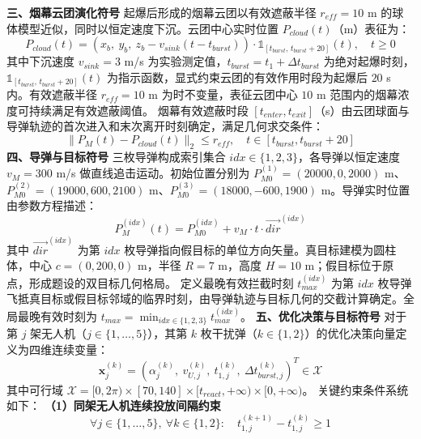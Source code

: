 \documentclass{JXUSTmodeling}
\begin{document}
\textbf{三、烟幕云团演化符号}
起爆后形成的烟幕云团以有效遮蔽半径 $r_{eff}=10$ m 的球体模型近似，同时以恒定速度下沉。云团中心实时位置 $P_{cloud}(t)$（m）表征为：
\begin{equation}
P_{cloud}(t) = \left(x_b,\ y_b,\ z_b - v_{sink}(t-t_{burst})\right) \cdot \mathbb{1}_{[t_{burst},\, t_{burst}+20]}(t),\quad t \geq 0 \tag{4}
\end{equation}
其中下沉速度 $v_{sink}=3$ m/s 为实验测定值，$t_{burst}=t_1+\Delta t_{burst}$ 为绝对起爆时刻，$\mathbb{1}_{[t_{burst},\, t_{burst}+20]}(t)$ 为指示函数，显式约束云团的有效作用时段为起爆后 $20$ s 内。有效遮蔽半径 $r_{eff}=10$ m 为时不变量，表征云团中心 $10$ m 范围内的烟幕浓度可持续满足有效遮蔽阈值。
烟幕有效遮蔽时段 $[t_{enter}, t_{exit}]$（s）由云团球面与导弹轨迹的首次进入和末次离开时刻确定，满足几何求交条件：
\begin{equation}
\|P_M(t)-P_{cloud}(t)\|_2 \leq r_{eff},\quad t \in [t_{burst}, t_{burst}+20] \tag{5}
\end{equation}
\textbf{四、导弹与目标符号}
三枚导弹构成索引集合 $idx\in\{1,2,3\}$，各导弹以恒定速度 $v_M=300$ m/s 做直线追击运动。初始位置分别为 $P_{M0}^{(1)}=(20000,0,2000)$ m、$P_{M0}^{(2)}=(19000,600,2100)$ m、$P_{M0}^{(3)}=(18000,-600,1900)$ m。导弹实时位置由参数方程描述：
\begin{equation}
P_M^{(idx)}(t) = P_{M0}^{(idx)} + v_M \cdot t \cdot \vec{dir}^{(idx)} \tag{6}
\end{equation}
其中 $\vec{dir}^{(idx)}$ 为第 $idx$ 枚导弹指向假目标的单位方向矢量。真目标建模为圆柱体，中心 $c=(0,200,0)$ m，半径 $R=7$ m，高度 $H=10$ m；假目标位于原点，形成题设的双目标几何格局。
定义最晚有效拦截时刻 $t_{max}^{(idx)}$ 为第 $idx$ 枚导弹飞抵真目标或假目标邻域的临界时刻，由导弹轨迹与目标几何的交截计算确定。全局最晚有效时刻为 $t_{max} = \min_{idx\in\{1,2,3\}} t_{max}^{(idx)}$。
\textbf{五、优化决策与目标符号}
对于第 $j$ 架无人机（$j\in\{1,\ldots,5\}$），其第 $k$ 枚干扰弹（$k\in\{1,2\}$）的优化决策向量定义为四维连续变量：
\begin{equation}
\mathbf{x}_j^{(k)} = \left(\alpha_j^{(k)},\ v_{U,j}^{(k)},\ t_{1,j}^{(k)},\ \Delta t_{burst,j}^{(k)}\right)^T \in \mathcal{X} \tag{7}
\end{equation}
其中可行域 $\mathcal{X}=[0,2\pi) \times [70,140] \times [t_{react},+\infty) \times [0,+\infty)$。
关键约束条件系统如下：
\textbf{（1）同架无人机连续投放间隔约束}
\begin{equation}
\forall j\in\{1,\ldots,5\},\ \forall k\in\{1,2\}:\quad t_{1,j}^{(k+1)} - t_{1,j}^{(k)} \geq 1 \tag{8}
\end{equation}
\end{document}
